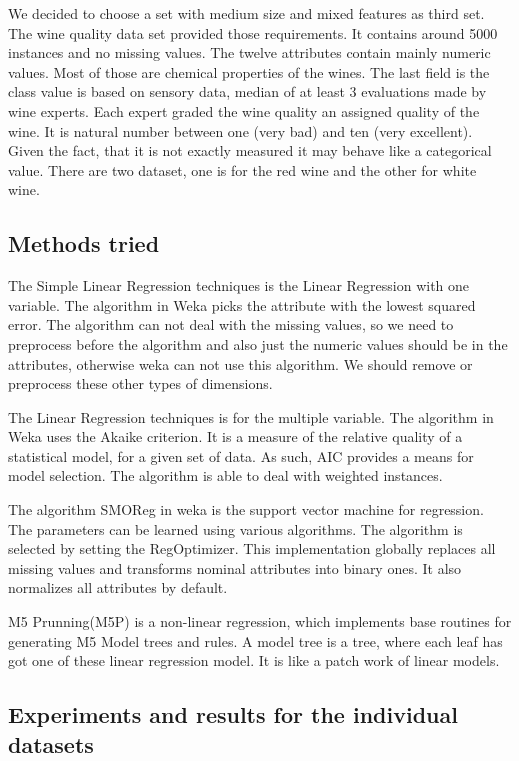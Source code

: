 \documentclass[a4paper]{article}
\begin{document}
We decided to choose a set with medium size and mixed features as third set. The
wine quality data set provided those requirements. It contains around 5000
instances and no missing values. The twelve attributes contain mainly numeric
values. Most of those are chemical properties of the wines. The last field is
the class value is based on sensory data, median of at least 3 evaluations made by wine experts. 
Each expert graded the wine quality  an assigned quality of the wine. It is natural number 
between one (very bad) and ten (very excellent).
Given the fact, that it is not exactly measured it may behave like a
categorical value. There are two dataset, one is for the red wine and the other for white wine.

\subsection{Methods tried}

    The Simple Linear Regression techniques is the Linear Regression with one variable. The algorithm in Weka picks the attribute with the lowest squared error. The algorithm can not deal with the missing values, so we need to preprocess before the algorithm and also just the numeric values should be in the attributes, otherwise weka can not use this algorithm. We should remove or preprocess these other types of dimensions.

     The Linear Regression techniques is for the multiple variable. The algorithm in Weka uses the Akaike criterion. It is a measure of the relative quality of a statistical model, for a given set of data. As such, AIC provides a means for model selection. The algorithm is able to deal with weighted instances.

     The algorithm SMOReg in weka is the support vector machine for regression. The parameters can be learned using various algorithms. The algorithm is selected by setting the RegOptimizer. This implementation globally replaces all missing values and transforms nominal attributes into binary ones. It also normalizes all attributes by default.

     M5 Prunning(M5P)  is a non-linear regression, which implements base routines for generating M5 Model trees and rules. A model tree is a tree, where each leaf has got one of these linear regression model. It is like a patch work of linear models.  

\subsection{Experiments and results for the individual datasets}
\end{document}
